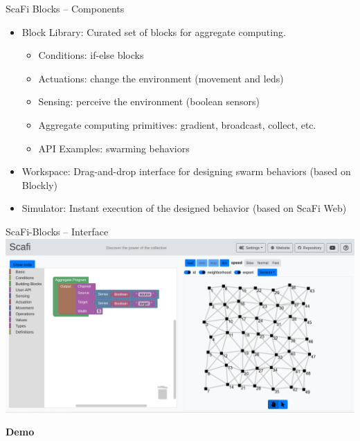 \documentclass[aspectratio=169]{beamer}
\begin{document}
\begin{frame}{ScaFi Blocks -- Components}
	\begin{itemize}
		\item \alert{Block Library:} Curated set of blocks for aggregate computing.
		\begin{itemize}
			\item Conditions: if-else blocks
			\item Actuations: change the environment (movement and leds)
			\item Sensing: perceive the environment (boolean sensors)
			\item Aggregate computing primitives: gradient, broadcast, collect, etc.
			\item API Examples: swarming behaviors 
		\end{itemize}
		\item \alert{Workspace:} Drag-and-drop interface for designing swarm behaviors (based on Blockly)
		\item \alert{Simulator:} Instant execution of the designed behavior (based on ScaFi Web)
	\end{itemize}
\end{frame}
\begin{frame}{ScaFi-Blocks -- Interface}
	\centering
	\includegraphics[width=\textwidth]{img/scafiblocks.png}
\end{frame}
\begin{frame}[standout]
	\Huge\textbf{Demo}
\end{frame}
\end{document}
